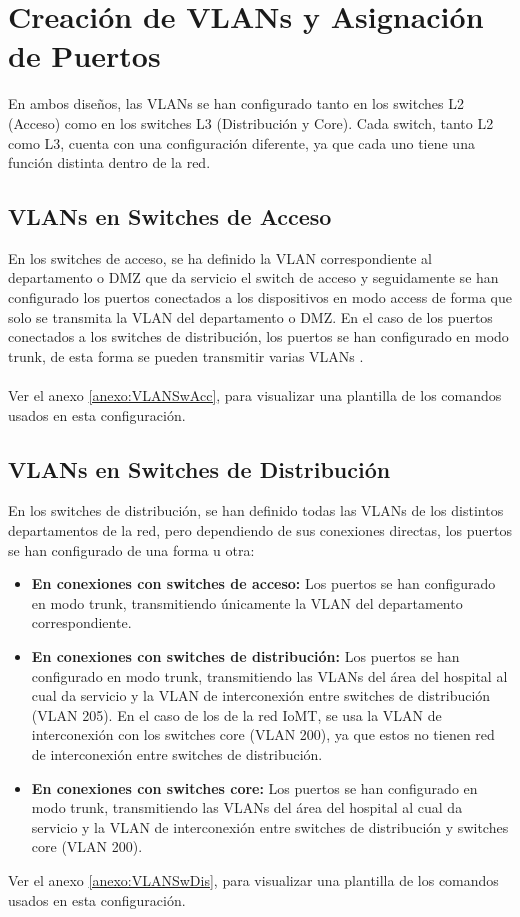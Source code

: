 \section{Creación de VLANs y Asignación de Puertos}
En ambos diseños, las VLANs se han configurado tanto en los switches L2 (Acceso) como en los switches L3 (Distribución y Core). Cada switch, tanto L2 como L3, cuenta con una configuración diferente, ya que cada uno tiene una función distinta dentro de la red.
\subsection{VLANs en Switches de Acceso}
En los switches de acceso, se ha definido la VLAN correspondiente al departamento o DMZ que da servicio el switch de acceso y seguidamente se han configurado los puertos conectados a los dispositivos en modo access de forma que solo se transmita la VLAN del departamento o DMZ. En el caso 
de los puertos conectados a los switches de distribución, los puertos se han configurado en modo trunk, de esta forma se pueden transmitir varias VLANs \cite{cisco_trunk_access}.  
\\ \\
Ver el anexo \ref{anexo:VLANSwAcc}, para visualizar una plantilla de los comandos usados en esta configuración.
\subsection{VLANs en Switches de Distribución}
En los switches de distribución, se han definido todas las VLANs de los distintos departamentos de la red, pero dependiendo de sus conexiones directas, los puertos se han configurado de una forma u otra:
\begin{itemize}
    \item \textbf{En conexiones con switches de acceso:} Los puertos se han configurado en modo trunk, transmitiendo únicamente la VLAN del departamento correspondiente.
    \item \textbf{En conexiones con switches de distribución:} Los puertos se han configurado en modo trunk, transmitiendo las VLANs del área del hospital al cual da servicio y la VLAN de interconexión entre switches de distribución (VLAN 205). En el caso de los de la red IoMT, se usa la VLAN de interconexión con los switches core (VLAN 200), ya que estos no tienen red de interconexión entre switches de distribución.
    \item \textbf{En conexiones con switches core:} Los puertos se han configurado en modo trunk, transmitiendo las VLANs del área del hospital al cual da servicio y la VLAN de interconexión entre switches de distribución y switches core (VLAN 200).
\end{itemize}
Ver el anexo \ref{anexo:VLANSwDis}, para visualizar una plantilla de los comandos usados en esta configuración.
